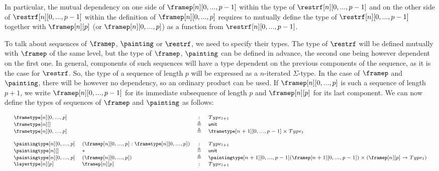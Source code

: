 \documentclass{msc}
\newcommand{\unittype}{\ensuremath{\mathsf{unit}}}
\newcommand{\unitpoint}{\ensuremath{\ast}}
\newcommand{\defeq}{\ensuremath{\triangleq}}
\begin{document}
In particular, the mutual dependency on one side of $\framep[n][0,...,p-1]$ within the type of $\restrf[n][0,...,p-1]$ and on the other side of $\restrf[n][0,...,p-1]$ within the definition of $\framep[n][0,...,p]$ requires to mutually define the type of $\restrf[n][0,...,p-1]$ together with $\framep[n][p]$ (or $\framep[n][0,...,p]$) as a function from $\restrf[n][0,...,p-1]$.

To talk about sequences of $\framep$, $\painting$ or $\restrf$, we need to specify their types. The type of $\restrf$ will be defined mutually with $\framep$ of the same level, but the type of $\framep$, $\painting$ can be defined in advance, the second one being however dependent on the first one. In general, components of such sequences will have a type dependent on the previous components of the sequence, as it is the case for $\restrf$. So, the type of a sequence of length $p$ will be expressed as a $n$-iterated $\Sigma$-type. In the case of $\framep$ and $\painting$, there will be however no dependency, so an ordinary product can be used. If $\framep[n][0,...,p]$ is such a sequence of length $p+1$, we write $\framep[n][0,...,p-1]$ for its immediate subsequence of length $p$ and $\framep[n][p]$ for its last component. We can now define the types of sequences of $\framep$ and $\painting$ as follows:

\begin{equation*}
  \fontsize{7.2}{9}\selectfont
  \begin{array}{llcl}
    \frametype[n][0,...,p]    &                                              & :      & Type_{l+1}                                                                                       \\
    \frametype[n][]           &                                              & \defeq & \unittype                                                                                        \\
    \frametype[n][0,...,p]    &                                              & \defeq & \frametype[n+1][0,...,p-1] \times Type_l                                                         \\
    \\
    \paintingtype[n][0,...,p] & (\framep[n][0,...,p]:\frametype[n][0,...,p]) & :      & Type_{l+1}                                                                                       \\
    \paintingtype[n][]        & \unitpoint                                   & \defeq & \unittype                                                                                        \\
    \paintingtype[n][0,...,p] & (\framep[n][0,...,p])                        & \defeq & \paintingtype[n+1][0,...,p-1](\framep[n+1][0,...,p-1]) \times (\framep[n][p] \rightarrow Type_l) \\
    \layertype[n][p]          & \framep[n][p]                                & :      & Type_{l+1}                                                                                       \\
  \end{array}
\end{equation*}
\end{document}

